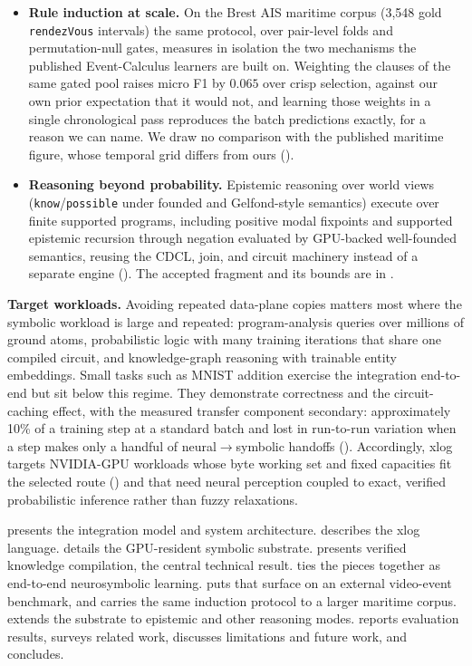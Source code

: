 \begin{itemize}
  \item \textbf{Rule induction at scale.} On the Brest AIS maritime corpus (3{,}548 gold \texttt{rendezVous} intervals) the same protocol, over pair-level folds and permutation-null gates, measures in isolation the two mechanisms the published Event-Calculus learners are built on. Weighting the clauses of the same gated pool raises micro F1 by $0.065$ over crisp selection, against our own prior expectation that it would not, and learning those weights in a single chronological pass reproduces the batch predictions exactly, for a reason we can name. We draw no comparison with the published maritime figure, whose temporal grid differs from ours ().
  \item \textbf{Reasoning beyond probability.} Epistemic reasoning over world views (\texttt{know}/\texttt{possible} under founded and Gelfond-style semantics) execute over finite supported programs, including positive modal fixpoints and supported epistemic recursion through negation evaluated by GPU-backed well-founded semantics, reusing the CDCL, join, and circuit machinery instead of a separate engine (). The accepted fragment and its bounds are in .
\end{itemize}

\textbf{Target workloads.} Avoiding repeated data-plane copies matters most where the symbolic workload is large and repeated: program-analysis queries over millions of ground atoms, probabilistic logic with many training iterations that share one compiled circuit, and knowledge-graph reasoning with trainable entity embeddings. Small tasks such as MNIST addition exercise the integration end-to-end but sit below this regime. They demonstrate correctness and the circuit-caching effect, with the measured transfer component secondary: approximately 10\% of a training step at a standard batch and lost in run-to-run variation when a step makes only a handful of neural$\to$symbolic handoffs (). Accordingly, xlog targets NVIDIA-GPU workloads whose byte working set and fixed capacities fit the selected route () and that need neural perception coupled to exact, verified probabilistic inference rather than fuzzy relaxations.

 presents the integration model and system architecture.  describes the xlog language.  details the GPU-resident symbolic substrate.  presents verified knowledge compilation, the central technical result.  ties the pieces together as end-to-end neurosymbolic learning.  puts that surface on an external video-event benchmark, and  carries the same induction protocol to a larger maritime corpus.  extends the substrate to epistemic and other reasoning modes.  reports evaluation results,  surveys related work,  discusses limitations and future work, and  concludes.
